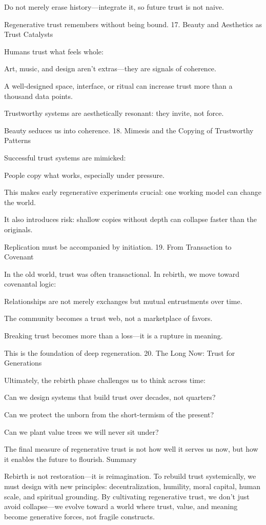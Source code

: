 \documentclass[11pt,oneside]{book}
\begin{document}
    Do not merely erase history—integrate it, so future trust is not naive.

Regenerative trust remembers without being bound.
17. Beauty and Aesthetics as Trust Catalysts

Humans trust what feels whole:

    Art, music, and design aren’t extras—they are signals of coherence.

    A well-designed space, interface, or ritual can increase trust more than a thousand data points.

    Trustworthy systems are aesthetically resonant: they invite, not force.

Beauty seduces us into coherence.
18. Mimesis and the Copying of Trustworthy Patterns

Successful trust systems are mimicked:

    People copy what works, especially under pressure.

    This makes early regenerative experiments crucial: one working model can change the world.

    It also introduces risk: shallow copies without depth can collapse faster than the originals.

Replication must be accompanied by initiation.
19. From Transaction to Covenant

In the old world, trust was often transactional. In rebirth, we move toward covenantal logic:

    Relationships are not merely exchanges but mutual entrustments over time.

    The community becomes a trust web, not a marketplace of favors.

    Breaking trust becomes more than a loss—it is a rupture in meaning.

This is the foundation of deep regeneration.
20. The Long Now: Trust for Generations

Ultimately, the rebirth phase challenges us to think across time:

    Can we design systems that build trust over decades, not quarters?

    Can we protect the unborn from the short-termism of the present?

    Can we plant value trees we will never sit under?

The final measure of regenerative trust is not how well it serves us now, but how it enables the future to flourish.
Summary

Rebirth is not restoration—it is reimagination. To rebuild trust systemically, we must design with new principles: decentralization, humility, moral capital, human scale, and spiritual grounding. By cultivating regenerative trust, we don't just avoid collapse—we evolve toward a world where trust, value, and meaning become generative forces, not fragile constructs.
\end{document}
